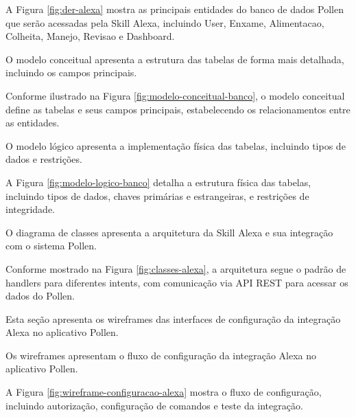 A Figura \ref{fig:der-alexa} mostra as principais entidades do banco de dados Pollen que serão acessadas pela Skill Alexa, incluindo User, Enxame, Alimentacao, Colheita, Manejo, Revisao e Dashboard.


O modelo conceitual apresenta a estrutura das tabelas de forma mais detalhada, incluindo os campos principais.



Conforme ilustrado na Figura \ref{fig:modelo-conceitual-banco}, o modelo conceitual define as tabelas e seus campos principais, estabelecendo os relacionamentos entre as entidades.


O modelo lógico apresenta a implementação física das tabelas, incluindo tipos de dados e restrições.



A Figura \ref{fig:modelo-logico-banco} detalha a estrutura física das tabelas, incluindo tipos de dados, chaves primárias e estrangeiras, e restrições de integridade.


O diagrama de classes apresenta a arquitetura da Skill Alexa e sua integração com o sistema Pollen.



Conforme mostrado na Figura \ref{fig:classes-alexa}, a arquitetura segue o padrão de handlers para diferentes intents, com comunicação via API REST para acessar os dados do Pollen.

\label{sec:interfaces-sistema}

Esta seção apresenta os wireframes das interfaces de configuração da integração Alexa no aplicativo Pollen.


Os wireframes apresentam o fluxo de configuração da integração Alexa no aplicativo Pollen.



A Figura \ref{fig:wireframe-configuracao-alexa} mostra o fluxo de configuração, incluindo autorização, configuração de comandos e teste da integração.

